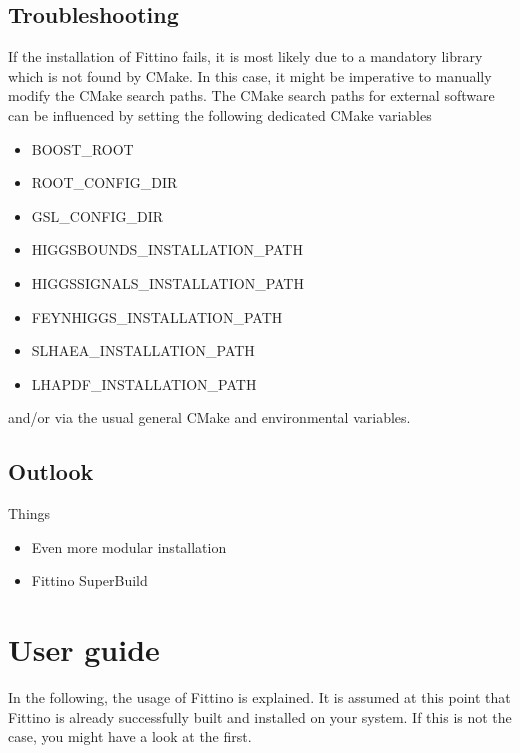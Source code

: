 \documentclass[letterpaper,10pt,english]{sphinxmanual}
\begin{document}
\section{Troubleshooting}
\label{troubleshooting:id1}
If the installation of Fittino fails, it is most likely due to a mandatory library which is not
found by CMake. In this case, it might be imperative to manually modify the CMake search paths. The
CMake search paths for external software can be influenced by setting the following dedicated CMake
variables
\begin{itemize}
\item {} 
BOOST\_ROOT

\item {} 
ROOT\_CONFIG\_DIR

\item {} 
GSL\_CONFIG\_DIR

\item {} 
HIGGSBOUNDS\_INSTALLATION\_PATH

\item {} 
HIGGSSIGNALS\_INSTALLATION\_PATH

\item {} 
FEYNHIGGS\_INSTALLATION\_PATH

\item {} 
SLHAEA\_INSTALLATION\_PATH

\item {} 
LHAPDF\_INSTALLATION\_PATH

\end{itemize}

and/or via the usual general CMake and environmental variables.


\section{Outlook}
\label{troubleshooting:outlook}
Things
\begin{itemize}
\item {} 
Even more modular installation

\item {} 
Fittino SuperBuild

\end{itemize}


\chapter{User guide}
\label{user_guide:user-guide}\label{user_guide::doc}\label{user_guide:id1}
In the following, the usage of Fittino is explained. It is assumed at this point that Fittino is
already successfully built and installed on your system. If this is not the case, you might have a
look at the {\hyperref[installation_guide:installation-guide]{\emph{}}} first.
\end{document}

